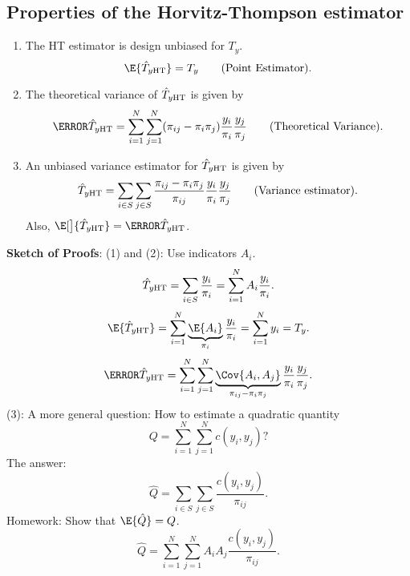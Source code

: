 \subsection{Properties of the Horvitz-Thompson estimator}
\begin{enumerate}[(1)]
      \item The HT estimator is design unbiased for $ T_y $.
            \[ \E{\hat{T}_{y\HT}}=T_y\qquad \text{(Point Estimator)}. \]
      \item The theoretical variance of $ \hat{T}_{y\text{HT}} $ is given by
            \[ \V{\hat{T}_{y\HT}}=\sum_{i=1}^{N}\sum_{j=1}^{N}(\pi_{ij}-\pi_i\pi_j)\frac{y_i}{\pi_i}\frac{y_j}{\pi_j}\qquad \text{(Theoretical Variance)}. \]
      \item An unbiased variance estimator for $ \hat{T}_{y\text{HT}} $ is given by
            \[ \relax{\hat{T}_{y\text{HT}}}=\sum_{i\in S}\sum_{j\in S}\frac{\pi_{ij}-\pi_i\pi_j}{\pi_{ij}}\frac{y_i}{\pi_i}\frac{y_j}{\pi_j}\qquad \text{(Variance estimator)}. \]
            Also, $ \E[\big]{\v{\hat{T}_{y\HT}}}=\V{\hat{T}_{y\HT}} $.
\end{enumerate}
\textbf{Sketch of Proofs}: (1) and (2): Use indicators $ A_i $.
\[ \hat{T}_{y\text{HT}}=\sum_{i\in S}\frac{y_i}{\pi_i}=\sum_{i=1}^{N}A_i \frac{y_i}{\pi_i}. \]
\[ \E{\hat{T}_{y\HT}}=\sum_{i=1}^{N}\underbrace{\E{A_i}}_{\pi_i}\frac{y_i}{\pi_i}=\sum_{i=1}^{N}y_i=T_y. \]
\[ \V{\hat{T}_{y\HT}}=\sum_{i=1}^{N}\sum_{j=1}^{N}\underbrace{\Cov{A_i,A_j}}_{\pi_{ij}-\pi_i\pi_j}\frac{y_i}{\pi_i}\frac{y_j}{\pi_j}. \]
(3): A more general question: How to estimate a quadratic quantity
\[ Q=\sum_{i=1}^{N}\sum_{j=1}^{N}c(y_i,y_j)? \]
The answer:
\[ \hat{Q}=\sum_{i\in S}\sum_{j\in S}\frac{c(y_i,y_j)}{\pi_{ij}}. \]
Homework: Show that $ \E{\hat{Q}}=Q $.
\[ \hat{Q}=\sum_{i=1}^{N}\sum_{j=1}^{N}A_i A_j \frac{c(y_i,y_j)}{\pi_{ij}}. \]
